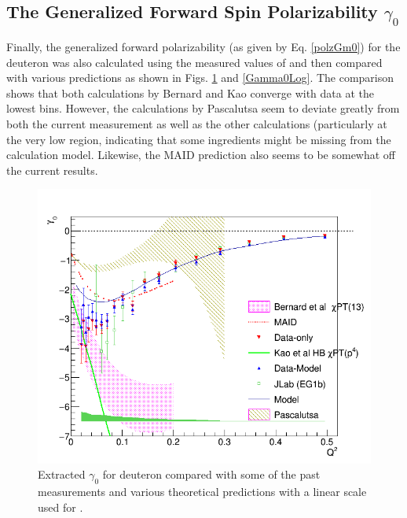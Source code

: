 \subsection{The Generalized Forward Spin Polarizability  $\gamma_0$}
Finally, the generalized forward polarizability (as given by Eq. \ref{polzGm0}) for the deuteron  was also calculated using the measured values of \afones and then compared with various predictions as shown in Figs. \ref{Gamma0Low} and \ref{Gamma0Log}. The comparison shows that both \chipts calculations by Bernard \etal and Kao \etal converge with data at the lowest \qsqs bins. However, the \chipts calculations by Pascalutsa \etal seem to deviate greatly from both the current measurement as well as the other \chipts calculations (particularly at the very low \qsqs region, indicating that some ingredients might be missing from the calculation model.%
Likewise, the MAID prediction also seems to be somewhat off the current results.


\begin{figure}[H] %
  \centering
  \leavevmode \includegraphics[width=1.0\textwidth]{figuresEG4/FigResults/integralsFromCombinedG1nA1F1_Wbins70Gm0LowQ2} 
  \caption[$\gamma^d_0$ (linear scale)]{Extracted $\gamma_0$ for deuteron compared with some of the past measurements and various theoretical predictions  with a linear scale used for \qsq.}
  \label{Gamma0Low}  
\end{figure}

